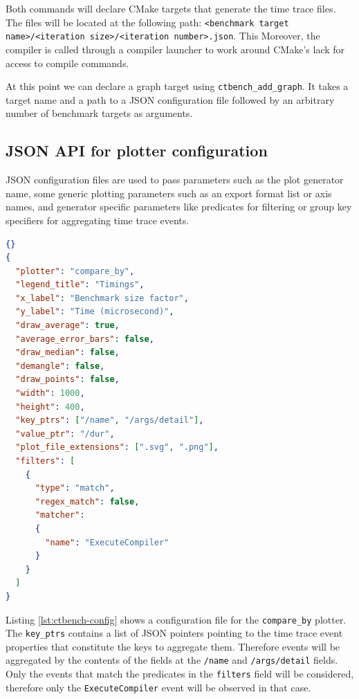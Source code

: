 \documentclass[../../main.tex]{subfiles}
\begin{document}
Both commands will declare CMake targets that generate the time trace files.
The files will be located at the following path:
\lstinline{<benchmark target name>/<iteration size>/<iteration number>.json}.
This
Moreover, the compiler is called through a compiler launcher to work around
CMake's lack for access to compile commands.

At this point we can declare a graph target using \lstinline{ctbench_add_graph}.
It takes a target name and a path to a JSON configuration file followed by an
arbitrary number of benchmark targets as arguments.

\subsection{JSON API for plotter configuration}
\label{lbl:ctbench-json-api}

JSON configuration files are used to pass parameters such as the plot generator
name, some generic plotting parameters such as an export format list or axis
names, and generator specific parameters like predicates for filtering or group
key specifiers for aggregating time trace events.

\begin{lstlisting}[language=json,
  caption=ctbench configuration file example,
  label=lst:ctbench-config]{}
{
  "plotter": "compare_by",
  "legend_title": "Timings",
  "x_label": "Benchmark size factor",
  "y_label": "Time (microsecond)",
  "draw_average": true,
  "average_error_bars": false,
  "draw_median": false,
  "demangle": false,
  "draw_points": false,
  "width": 1000,
  "height": 400,
  "key_ptrs": ["/name", "/args/detail"],
  "value_ptr": "/dur",
  "plot_file_extensions": [".svg", ".png"],
  "filters": [
    {
      "type": "match",
      "regex_match": false,
      "matcher":
      {
        "name": "ExecuteCompiler"
      }
    }
  ]
}
\end{lstlisting}

Listing \ref{lst:ctbench-config} shows a configuration file for the
\lstinline{compare_by} plotter. The \lstinline{key_ptrs} contains a list of
JSON pointers pointing to the time trace event properties that constitute the
keys to aggregate them. Therefore events will be aggregated by the contents of
the fields at the \lstinline{/name} and \lstinline{/args/detail} fields.
Only the events that match the predicates in the \lstinline{filters} field will
be considered, therefore only the \lstinline{ExecuteCompiler} event will be
observed in that case.
\end{document}
